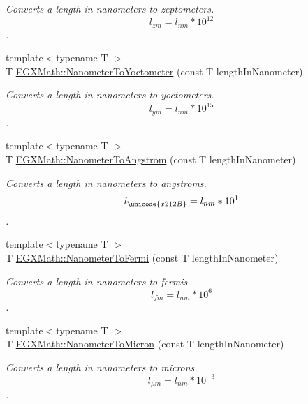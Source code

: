 \begin{DoxyCompactItemize}
\begin{DoxyCompactList}\small\item\em Converts a length in nanometers to zeptometers. \[ l_{zm}=l_{nm} * 10^{12} \]. \end{DoxyCompactList}\item 
{\footnotesize template$<$typename T $>$ }\\T \mbox{\hyperlink{group___e_g_x_math-_conversions-_length_conversions-_s_i-_nanometer-_s_i_gab447c3aa3d215a1030a63e28f9aca1c1}{E\+G\+X\+Math\+::\+Nanometer\+To\+Yoctometer}} (const T length\+In\+Nanometer)
\begin{DoxyCompactList}\small\item\em Converts a length in nanometers to yoctometers. \[ l_{ym}=l_{nm} * 10^{15} \]. \end{DoxyCompactList}\item 
{\footnotesize template$<$typename T $>$ }\\T \mbox{\hyperlink{group___e_g_x_math-_conversions-_length_conversions-_s_i-_nanometer-_non-_s_i_ga7e2062d4cc1a422e54da597c4413efb1}{E\+G\+X\+Math\+::\+Nanometer\+To\+Angstrom}} (const T length\+In\+Nanometer)
\begin{DoxyCompactList}\small\item\em Converts a length in nanometers to angstroms. \[ l_{\unicode{x212B}}=l_{nm} * 10^{1} \]. \end{DoxyCompactList}\item 
{\footnotesize template$<$typename T $>$ }\\T \mbox{\hyperlink{group___e_g_x_math-_conversions-_length_conversions-_s_i-_nanometer-_non-_s_i_ga9b708f83b519464f5ebb912bcaaf747d}{E\+G\+X\+Math\+::\+Nanometer\+To\+Fermi}} (const T length\+In\+Nanometer)
\begin{DoxyCompactList}\small\item\em Converts a length in nanometers to fermis. \[ l_{fm}=l_{nm} * 10^{6} \]. \end{DoxyCompactList}\item 
{\footnotesize template$<$typename T $>$ }\\T \mbox{\hyperlink{group___e_g_x_math-_conversions-_length_conversions-_s_i-_nanometer-_non-_s_i_ga278b008cafd5027568e16cbc8af7fb6a}{E\+G\+X\+Math\+::\+Nanometer\+To\+Micron}} (const T length\+In\+Nanometer)
\begin{DoxyCompactList}\small\item\em Converts a length in nanometers to microns. \[ l_{\mu m}=l_{nm} * 10^{-3} \]. \end{DoxyCompactList}\item 

\end{DoxyCompactItemize}
